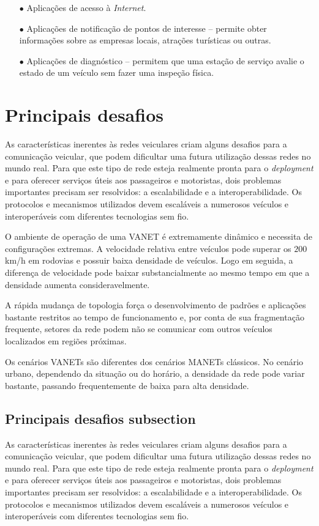 \begin{enumerate}
 \item[$\bullet$] Aplicações de acesso à \textit{Internet}.
 \item[$\bullet$] Aplicações de notificação de pontos de interesse -- permite
 obter informações sobre as empresas locais, atrações turísticas ou outras.
 \item[$\bullet$] Aplicações de diagnóstico -- permitem que uma estação de
 serviço avalie o estado de um veículo sem fazer uma inspeção física.
\end{enumerate}

\section{Principais desafios}
As características inerentes às redes veiculares criam alguns desafios para a
comunicação veicular, que podem dificultar uma futura utilização dessas redes no
mundo real. Para que este tipo de rede esteja realmente pronta para o
\textit{deployment} e para oferecer serviços úteis aos passageiros e
motoristas, dois problemas importantes precisam ser resolvidos: a
escalabilidade e a interoperabilidade. Os protocolos e mecanismos utilizados
devem escaláveis a numerosos veículos e interoperáveis com diferentes
tecnologias sem fio.

O ambiente de operação de uma VANET é extremamente dinâmico e necessita de
configurações extremas. A velocidade relativa entre veículos pode superar os
$200$ km/h em rodovias e possuir baixa densidade de veículos. Logo em seguida, a
diferença de velocidade pode baixar substancialmente ao mesmo tempo em que a
densidade aumenta consideravelmente.

A rápida mudança de topologia força o desenvolvimento de padrões e aplicações
bastante restritos ao tempo de funcionamento e, por conta de sua fragmentação
frequente, setores da rede podem não se comunicar com outros veículos
localizados em regiões próximas.

Os cenários VANETs são diferentes dos cenários MANETs clássicos. No cenário
urbano, dependendo da situação ou do horário, a densidade da rede pode variar
bastante, passando frequentemente de baixa para alta densidade.

\subsection{Principais desafios subsection} %
\label{sub:principais_desafios_subsection}

As características inerentes às redes veiculares criam alguns desafios para a
comunicação veicular, que podem dificultar uma futura utilização dessas redes no
mundo real. Para que este tipo de rede esteja realmente pronta para o
\textit{deployment} e para oferecer serviços úteis aos passageiros e
motoristas, dois problemas importantes precisam ser resolvidos: a
escalabilidade e a interoperabilidade. Os protocolos e mecanismos utilizados
devem escaláveis a numerosos veículos e interoperáveis com diferentes
tecnologias sem fio.


